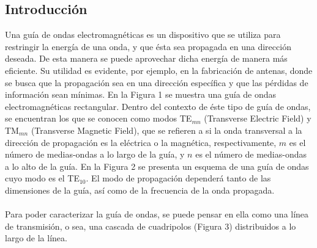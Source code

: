\documentclass[11pt,a4paper]{article}
\begin{document}
\begin{multicols}{2}
\section{Introducción}
Una guía de ondas electromagnéticas es un dispositivo que se utiliza para restringir la energía de una onda, y que ésta sea propagada en una dirección deseada. De esta manera se puede aprovechar dicha energía de manera más eficiente. Su utilidad es evidente, por ejemplo, en la fabricación de antenas, donde se busca que la propagación sea en una dirección específica y que las pérdidas de información sean mínimas. En la Figura 1 se muestra una guía de ondas electromagnéticas rectangular.
Dentro del contexto de éste tipo de guía de ondas, se encuentran los que se conocen como modos TE$_{mn}$ (Transverse Electric Field) y TM$_{mn}$ (Transverse Magnetic Field), que se refieren a si la onda transversal a la dirección de propagación es la eléctrica o la magnética, respectivamente, $m$ es el número de medias-ondas a lo largo de la guía, y $n$ es el número de medias-ondas a lo alto de la guía. En la Figura 2 se presenta un esquema de una guía de ondas cuyo modo es el TE$_{10}$.
El modo de propagación dependerá tanto de las dimensiones de la guía, así como de la frecuencia de la onda propagada. \\ \\
Para poder caracterizar la guía de ondas, se puede pensar en ella como una línea de transmisión, o sea, una cascada de cuadripolos (Figura 3) distribuidos a lo largo de la línea.
\begin{center}
\end{center}
\end{multicols}
\end{document}
